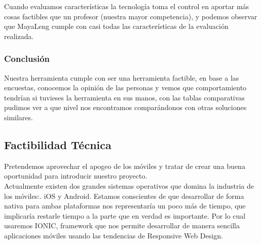 \documentclass[a4paper,openright,11pt]{article}
\begin{document}
\begin{table}[H]
\caption{Comparativa de Caracter\'isticas}
Cuando evaluamos características la tecnología toma el control en aportar más cosas factibles que un profesor (nuestra mayor competencia), y podemos observar que MayaLeng cumple con casi todas las características de la evaluación realizada.
\end{table}

\subsubsection{Conclusión}
Nuestra herramienta cumple con ser una herramienta factible, en base a las encuestas, conocemos la opinión de las personas y vemos que comportamiento tendrían si tuvieses la herramienta en sus manos, con las tablas comparativas pudimos ver a que nivel nos encontramos comparándonos con otras soluciones similares.

\subsection{Factibilidad T\'ecnica}
Pretendemos aprovechar el apogeo de los m\'oviles y tratar de crear una buena oportunidad para introducir nuestro proyecto.\\
Actualmente existen dos grandes sistemas operativos que domina la industria de los m\'oviles:. iOS y Android. Estamos conscientes de que desarrollar de forma nativa para ambas plataformas nos representar\'ia un poco m\'as de tiempo, que implicar\'ia restarle tiempo a la parte que en verdad es importante. Por lo cual usaremos IONIC, framework que nos permite desarrollar de manera sencilla aplicaciones m\'oviles usando las tendencias de Responsive Web Design. \\
\end{document}
